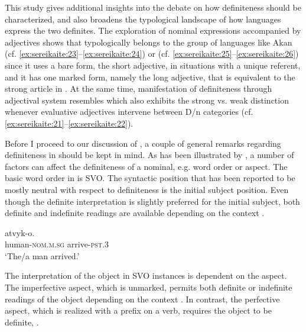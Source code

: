\documentclass[output=paper,
modfonts
]{langscibook}
\begin{document}
This study gives additional insights into the debate on how definiteness should be characterized, and also broadens the typological landscape of how languages express the two definites. The exploration of nominal expressions accompanied by adjectives shows that  typologically belongs to the group of languages like Akan (cf. \ref{ex:sereikaite:23}--\ref{ex:sereikaite:24}) or  (cf. \ref{ex:sereikaite:25}--\ref{ex:sereikaite:26}) since it uses a bare form, the short adjective, in situations with a unique referent, and it has one marked form, namely the long adjective, that is equivalent to the strong article in . At the same time,  manifestation of definiteness through adjectival system resembles  which also exhibits the strong vs. weak distinction whenever evaluative adjectives intervene between D/n categories (cf. \ref{ex:sereikaite:21}--\ref{ex:sereikaite:22}).

Before I proceed to our discussion of , a couple of general remarks regarding definiteness in  should be kept in mind. As has been illustrated by \citet{GillonArmoskaite2015}, a number of factors can affect the definiteness of a nominal, e.g. word order or aspect. The basic word order in  is SVO. The syntactic position that has been reported to be mostly neutral with respect to definiteness is the initial subject position. Even though the definite interpretation is slightly preferred for the initial subject, both definite and indefinite readings are available depending on the context .

\begin{exe} 
\ex \label{ex:sereikaite:29}
 {atvyk-o}.\\
human-\textsc{nom.m.sg} arrive-\textsc{pst.3}\\
\trans `The/a man arrived.' \citep[74]{GillonArmoskaite2015}
\end{exe} 

The interpretation of the object in SVO instances is dependent on the aspect. The imperfective aspect, which is unmarked, permits both definite or indefinite readings of the object depending on the context . In contrast, the perfective aspect, which is realized with a prefix on a verb, requires the object to be definite, . %
\end{document}
